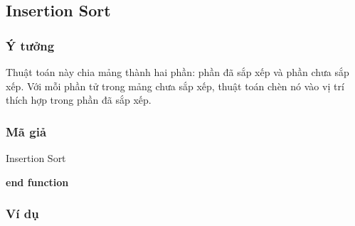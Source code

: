 \subsection{Insertion Sort}


\subsubsection{Ý tưởng}

Thuật toán này chia mảng thành hai phần: phần đã sắp xếp và 
phần chưa sắp xếp. Với mỗi phần tử trong mảng chưa sắp xếp, thuật toán chèn nó vào vị trí thích hợp trong phần đã sắp xếp.

\subsubsection{Mã giả}

\begin{algorithm}[H]
\caption{Insertion Sort}
\textbf{end function}
\end{algorithm}

\subsubsection{Ví dụ}

